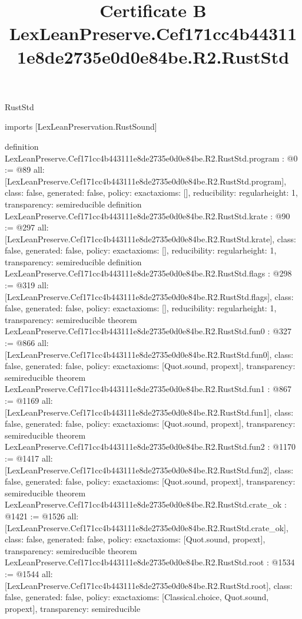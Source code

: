 \begin{lexlean}{RustStd}
\title{Certificate B LexLeanPreserve.Cef171cc4b443111e8de2735e0d0e84be.R2.RustStd}
\begin{coremodule}
imports [LexLeanPreservation.RustSound]

definition LexLeanPreserve.Cef171cc4b443111e8de2735e0d0e84be.R2.RustStd.program : @0 := @89 {
  all: [LexLeanPreserve.Cef171cc4b443111e8de2735e0d0e84be.R2.RustStd.program],
  class: false,
  generated: false,
  policy: exact{axioms: []},
  reducibility: regular{height: 1},
  transparency: semireducible
}
definition LexLeanPreserve.Cef171cc4b443111e8de2735e0d0e84be.R2.RustStd.krate : @90 := @297 {
  all: [LexLeanPreserve.Cef171cc4b443111e8de2735e0d0e84be.R2.RustStd.krate],
  class: false,
  generated: false,
  policy: exact{axioms: []},
  reducibility: regular{height: 1},
  transparency: semireducible
}
definition LexLeanPreserve.Cef171cc4b443111e8de2735e0d0e84be.R2.RustStd.flags : @298 := @319 {
  all: [LexLeanPreserve.Cef171cc4b443111e8de2735e0d0e84be.R2.RustStd.flags],
  class: false,
  generated: false,
  policy: exact{axioms: []},
  reducibility: regular{height: 1},
  transparency: semireducible
}
theorem LexLeanPreserve.Cef171cc4b443111e8de2735e0d0e84be.R2.RustStd.fun0 : @327 := @866 {
  all: [LexLeanPreserve.Cef171cc4b443111e8de2735e0d0e84be.R2.RustStd.fun0],
  class: false,
  generated: false,
  policy: exact{axioms: [Quot.sound, propext]},
  transparency: semireducible
}
theorem LexLeanPreserve.Cef171cc4b443111e8de2735e0d0e84be.R2.RustStd.fun1 : @867 := @1169 {
  all: [LexLeanPreserve.Cef171cc4b443111e8de2735e0d0e84be.R2.RustStd.fun1],
  class: false,
  generated: false,
  policy: exact{axioms: [Quot.sound, propext]},
  transparency: semireducible
}
theorem LexLeanPreserve.Cef171cc4b443111e8de2735e0d0e84be.R2.RustStd.fun2 : @1170 := @1417 {
  all: [LexLeanPreserve.Cef171cc4b443111e8de2735e0d0e84be.R2.RustStd.fun2],
  class: false,
  generated: false,
  policy: exact{axioms: [Quot.sound, propext]},
  transparency: semireducible
}
theorem LexLeanPreserve.Cef171cc4b443111e8de2735e0d0e84be.R2.RustStd.crate_ok : @1421 := @1526 {
  all: [LexLeanPreserve.Cef171cc4b443111e8de2735e0d0e84be.R2.RustStd.crate_ok],
  class: false,
  generated: false,
  policy: exact{axioms: [Quot.sound, propext]},
  transparency: semireducible
}
theorem LexLeanPreserve.Cef171cc4b443111e8de2735e0d0e84be.R2.RustStd.root : @1534 := @1544 {
  all: [LexLeanPreserve.Cef171cc4b443111e8de2735e0d0e84be.R2.RustStd.root],
  class: false,
  generated: false,
  policy: exact{axioms: [Classical.choice, Quot.sound, propext]},
  transparency: semireducible
}


\end{coremodule}
\end{lexlean}

